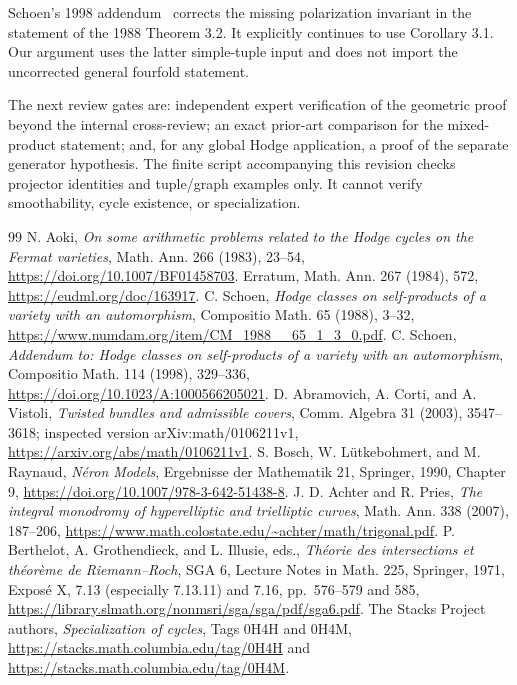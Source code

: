\documentclass[11pt]{article}
\theoremstyle{definition}
\begin{document}
Schoen's 1998 addendum~\cite{SchoenAddendum} corrects the missing polarization
invariant in the statement of the 1988 Theorem 3.2. It explicitly continues to
use Corollary 3.1. Our argument uses the latter simple-tuple input and does not
import the uncorrected general fourfold statement.

The next review gates are: independent expert verification of the geometric
proof beyond the internal cross-review; an exact prior-art comparison for the mixed-product
statement; and, for any global Hodge application, a proof of the separate
generator hypothesis. The finite script accompanying this revision checks
projector identities and tuple/graph examples only. It cannot verify
smoothability, cycle existence, or specialization.

\begin{thebibliography}{99}
 N. Aoki, \emph{On some arithmetic problems related to the Hodge
cycles on the Fermat varieties}, Math. Ann. 266 (1983), 23--54,
\url{https://doi.org/10.1007/BF01458703}. Erratum, Math. Ann. 267 (1984), 572,
\url{https://eudml.org/doc/163917}.
 C. Schoen, \emph{Hodge classes on self-products of a variety
with an automorphism}, Compositio Math. 65 (1988), 3--32,
\url{https://www.numdam.org/item/CM_1988__65_1_3_0.pdf}.
 C. Schoen, \emph{Addendum to: Hodge classes on
self-products of a variety with an automorphism}, Compositio Math. 114 (1998),
329--336, \url{https://doi.org/10.1023/A:1000566205021}.
 D. Abramovich, A. Corti, and A. Vistoli, \emph{Twisted bundles
and admissible covers}, Comm. Algebra 31 (2003), 3547--3618; inspected version
arXiv:math/0106211v1, \url{https://arxiv.org/abs/math/0106211v1}.
 S. Bosch, W. L\"utkebohmert, and M. Raynaud, \emph{N\'eron
Models}, Ergebnisse der Mathematik 21, Springer, 1990, Chapter 9,
\url{https://doi.org/10.1007/978-3-642-51438-8}.
 J. D. Achter and R. Pries, \emph{The integral monodromy of
hyperelliptic and trielliptic curves}, Math. Ann. 338 (2007), 187--206,
\url{https://www.math.colostate.edu/~achter/math/trigonal.pdf}.
 P. Berthelot, A. Grothendieck, and L. Illusie, eds.,
\emph{Th\'eorie des intersections et th\'eor\`eme de Riemann--Roch}, SGA 6,
Lecture Notes in Math. 225, Springer, 1971, Expos\'e X, 7.13 (especially
7.13.11) and 7.16, pp.~576--579 and 585,
\url{https://library.slmath.org/nonmsri/sga/sga/pdf/sga6.pdf}.
 The Stacks Project authors, \emph{Specialization of cycles},
Tags 0H4H and 0H4M, \url{https://stacks.math.columbia.edu/tag/0H4H} and
\url{https://stacks.math.columbia.edu/tag/0H4M}.
\end{thebibliography}
\end{document}
